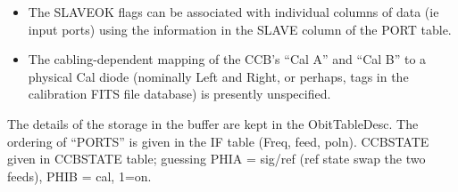 \documentclass[11pt]{article}
\begin{document}
{{{{{\begin{itemize}
\item  The SLAVEOK flags can be associated with individual columns of data 
(ie input ports) using the information in the SLAVE column of the PORT table.
\item  The cabling-dependent mapping of the CCB's ``Cal A'' and ``Cal B'' to a physical Cal diode 
(nominally Left and Right, or perhaps, tags in the calibration FITS file database) is 
presently unspecified.
\end{itemize}
The details of the storage in the buffer are kept in the 
ObitTableDesc.
The ordering of ``PORTS'' is given in the IF table (Freq, feed, poln).
CCBSTATE given in CCBSTATE table; guessing PHIA = sig/ref (ref state
swap the two feeds), PHIB = cal, 1=on.
}

%
\begin{columns}
\end{columns}
%
\begin{history}
\end{history}
\clearpage

}}}}
\end{document}
